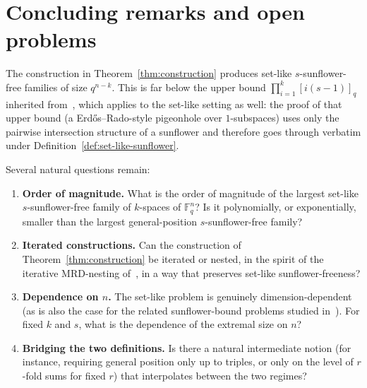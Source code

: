 \documentclass[11pt]{article}
\theoremstyle{definition}
\newcommand{\F}{\mathbb{F}}
\begin{document}
\section{Concluding remarks and open problems}

The construction in Theorem~\ref{thm:construction} produces set-like $s$-sunflower-free families of size $q^{n-k}$. This is far below the upper bound $\prod_{i=1}^k [i(s-1)]_q$ inherited from~\cite{ik2026}, which applies to the set-like setting as well: the proof of that upper bound (a Erd\H{o}s--Rado-style pigeonhole over $1$-subspaces) uses only the pairwise intersection structure of a sunflower and therefore goes through verbatim under Definition~\ref{def:set-like-sunflower}.

Several natural questions remain:

\begin{enumerate}[leftmargin=*, itemsep=2pt]
  \item \textbf{Order of magnitude.} What is the order of magnitude of the largest set-like $s$-sunflower-free family of $k$-spaces of $\F_q^n$? Is it polynomially, or exponentially, smaller than the largest general-position $s$-sunflower-free family?
  \item \textbf{Iterated constructions.} Can the construction of Theorem~\ref{thm:construction} be iterated or nested, in the spirit of the iterative MRD-nesting of~\cite{ik2026}, in a way that preserves set-like sunflower-freeness?
  \item \textbf{Dependence on $n$.} The set-like problem is genuinely dimension-dependent (as is also the case for the related sunflower-bound problems studied in~\cite{bdh}). For fixed $k$ and $s$, what is the dependence of the extremal size on $n$?
  \item \textbf{Bridging the two definitions.} Is there a natural intermediate notion (for instance, requiring general position only up to triples, or only on the level of $r$-fold sums for fixed $r$) that interpolates between the two regimes?
\end{enumerate}


\end{document}
